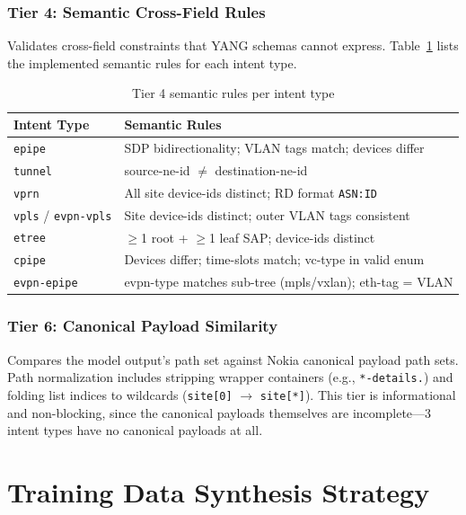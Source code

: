 \documentclass[12pt, a4paper]{article}
\newcommand{\intenttype}[1]{\texttt{#1}}
\newcommand{\yang}{\textsc{YANG}}
\begin{document}
\subsubsection{Tier 4: Semantic Cross-Field Rules}

Validates cross-field constraints that \yang{} schemas cannot express. Table~\ref{tab:semantic-rules} lists the implemented semantic rules for each intent type.

\begin{table}[H]
\centering
\caption{Tier 4 semantic rules per intent type}
\label{tab:semantic-rules}
\small
\begin{tabular}{lp{9cm}}
\toprule
\textbf{Intent Type} & \textbf{Semantic Rules} \\
\midrule
\intenttype{epipe} &
  SDP bidirectionality; VLAN tags match; devices differ \\
\intenttype{tunnel} &
  source-ne-id $\neq$ destination-ne-id \\
\intenttype{vprn} &
  All site device-ids distinct; RD format \texttt{ASN:ID} \\
\intenttype{vpls} / \intenttype{evpn-vpls} &
  Site device-ids distinct; outer VLAN tags consistent \\
\intenttype{etree} &
  $\geq$1 root + $\geq$1 leaf SAP; device-ids distinct \\
\intenttype{cpipe} &
  Devices differ; time-slots match; vc-type in valid enum \\
\intenttype{evpn-epipe} &
  evpn-type matches sub-tree (mpls/vxlan); eth-tag = VLAN \\
\bottomrule
\end{tabular}
\end{table}

\subsubsection{Tier 6: Canonical Payload Similarity}
\label{sec:tier6}

Compares the model output's path set against Nokia canonical payload path sets. Path normalization includes stripping wrapper containers (e.g., \texttt{*-details.}) and folding list indices to wildcards (\texttt{site[0]} $\to$ \texttt{site[*]}). This tier is informational and non-blocking, since the canonical payloads themselves are incomplete---3 intent types have no canonical payloads at all.

\section{Training Data Synthesis Strategy}
\label{sec:data-generation}
\end{document}

